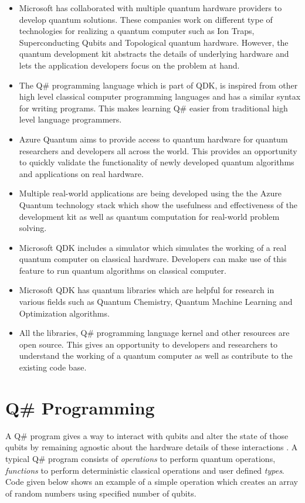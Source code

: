 \documentclass[english,a4paper,11pt,oneside,onecolumn]{book}
\begin{document}
\begin{itemize}
    \item Microsoft has collaborated with multiple quantum hardware providers to develop quantum solutions. These companies work on different type of technologies for realizing a quantum computer such as Ion Traps, Superconducting Qubits and Topological quantum hardware. However, the quantum development kit abstracts the details of underlying hardware and lets the application developers focus on the problem at hand.
    
    \item The Q\# programming language which is part of QDK, is inspired from other high level classical computer programming languages and has a similar syntax for writing programs. This makes learning Q\# easier from traditional high level language programmers.
    
    \item Azure Quantum aims to provide access to quantum hardware for quantum researchers and developers all across the world. This provides an opportunity to quickly validate the functionality of newly developed quantum algorithms and applications on real hardware.
    
    \item Multiple real-world applications are being developed using the the Azure Quantum technology stack which show the usefulness and effectiveness of the development kit as well as quantum computation for real-world problem solving.
    
    \item Microsoft QDK includes a simulator which simulates the working of a real quantum computer on classical hardware. Developers can make use of this feature to run quantum algorithms on classical computer.
    
    \item Microsoft QDK has quantum libraries which are helpful for research in various fields such as Quantum Chemistry, Quantum Machine Learning and Optimization algorithms.
    
    \item All the libraries, Q\# programming language kernel and other resources are open source. This gives an opportunity to developers and researchers to understand the working of a quantum computer as well as contribute to the existing code base.
\end{itemize}

\section{Q\# Programming}
\label{sec:qSharp}
A Q\# program gives a way to interact with qubits and alter the state of those qubits by remaining agnostic about the hardware details of these interactions \cite{cjgronlund_microsoft}. A typical Q\# program consists of \emph{operations} to perform quantum operations, \emph{functions} to perform deterministic classical operations and user defined \emph{types}. Code given below shows an example of a simple operation which creates an array of random numbers using specified number of qubits.
\end{document}

